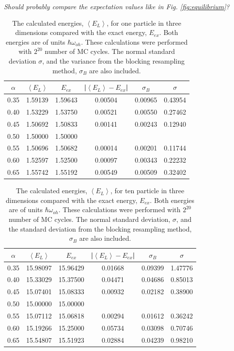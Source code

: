\textit{Should probably compare the expectation values like in Fig. \ref{fig:equilibrium}?}

\begin{table}[H]\caption{The calculated energies, $\left<E_L\right>$, for one particle in three dimensions compared with the exact energy, $E_{ex}$. Both energies are of units $\hbar\omega_{oh}$. These calculations were performed with $2^{20}$ number of MC cycles. The normal standard deviation $\sigma$, and the variance from the blocking resampling method, $\sigma_B$ are also included. }\label{tab:importance_N_1}
\center
\begin{tabular}{cccccc}
$\alpha$ & $\left< E_L \right>$ & $E_{ex}$ & |$\left< E_L \right>-E_{ex}$|  & $\sigma_B$ & $\sigma$\\ \hline
0.35 & 1.59139 & 1.59643 & 0.00504 & 0.00965 & 0.43954\\
0.40 & 1.53229 & 1.53750 & 0.00521 & 0.00550 & 0.27462\\
0.45 & 1.50692 & 1.50833 & 0.00141 & 0.00243 & 0.12940\\
0.50 & 1.50000 & 1.50000 &                &                &                 \\
0.55 & 1.50696 & 1.50682 & 0.00014 & 0.00201 & 0.11744\\
0.60 & 1.52597 & 1.52500 & 0.00097 & 0.00343 & 0.22232\\
0.65 & 1.55742 & 1.55192 & 0.00549 & 0.00509 & 0.32402\\
\end{tabular}
\end{table} 

\begin{table}[H]\caption{The calculated energies, $\left<E_L\right>$, for ten particle in three dimensions compared with the exact energy, $E_{ex}$. Both energies are of units $\hbar\omega_{oh}$. These calculations were performed with $2^{20}$ number of MC cycles. The normal standard deviation, $\sigma$, and the standard deviation from the blocking resampling method, $\sigma_B$ are also included.}\label{tab:importance_N_10}
\center
\begin{tabular}{cccccc}
$\alpha$ & $\left< E_L \right>$ & $E_{ex}$ & |$\left< E_L \right>-E_{ex}$|  & $\sigma_B$ & $\sigma$\\ \hline
0.35 & 15.98097 & 15.96429 & 0.01668 & 0.09399 & 1.47776\\
0.40 & 15.33029 & 15.37500 & 0.04471 & 0.04686 & 0.85013\\
0.45 & 15.07401 & 15.08333 & 0.00932 & 0.02182 & 0.38900\\
0.50 & 15.00000 & 15.00000 &                &                &                \\
0.55 & 15.07112 & 15.06818 & 0.00294 & 0.01612 & 0.36242\\
0.60 & 15.19266 & 15.25000 & 0.05734 & 0.03098 & 0.70746\\
0.65 & 15.54807 & 15.51923 & 0.02884 & 0.04239 & 0.98210\\
\end{tabular}
\end{table} 

